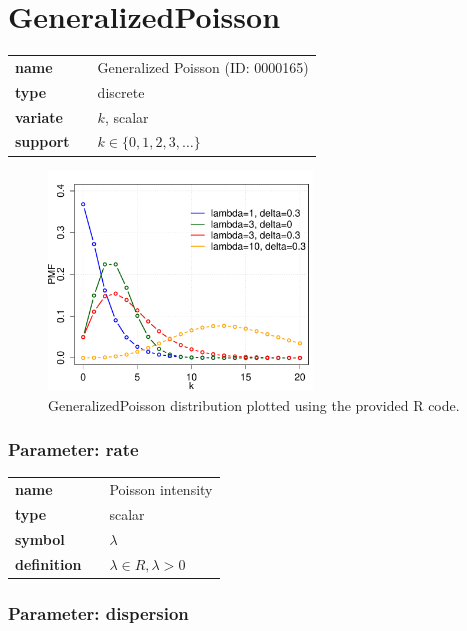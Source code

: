 \section*{GeneralizedPoisson} 

  \bigskip 

\begin{tabular}{p{2cm}cl}
\textbf{name} & & Generalized Poisson (ID: 0000165)\\ 
 
\textbf{type} & & discrete \\ 

\textbf{variate} & & $k
$, scalar \\ 

\textbf{support} & & $k \in \{0,1,2,3,\dots\}$
\end{tabular}

\begin{figure}[ht!]
\centering
  \includegraphics[width=70mm]{pics/GeneralizedPoisson.pdf}
 \caption{GeneralizedPoisson distribution plotted using the provided R code.}
 \label{fig:GeneralizedPoisson}
\end{figure}

\subsubsection*{Parameter: rate}

\noindent\begin{tabular}{p{2cm}cl}
\textbf{name} & & Poisson intensity \\
\textbf{type} & & scalar \\
\textbf{symbol} & & $\lambda$  \\
\textbf{definition} & & $\lambda \in R, \lambda > 0$
\end{tabular}
\subsubsection*{Parameter: dispersion}

